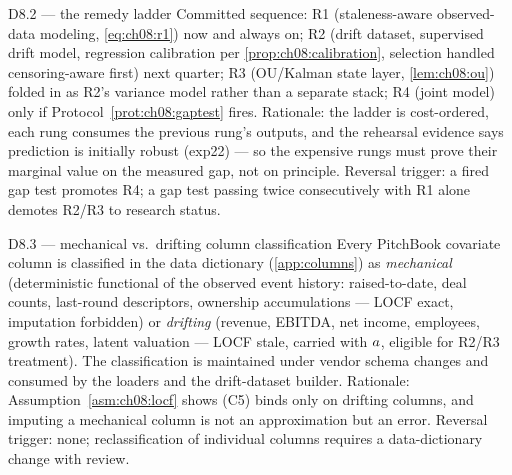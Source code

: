 \begin{decision}{D8.2 --- the remedy ladder}
Committed sequence: R1 (staleness-aware observed-data modeling,
\cref{eq:ch08:r1}) now and always on; R2 (drift dataset, supervised
drift model, regression calibration per \cref{prop:ch08:calibration},
selection handled censoring-aware first) next quarter; R3 (OU/Kalman
state layer, \cref{lem:ch08:ou}) folded in as R2's variance model rather
than a separate stack; R4 (joint model) only if
Protocol~\ref{prot:ch08:gaptest} fires. Rationale: the ladder is cost-ordered,
each rung consumes the previous rung's outputs, and the rehearsal
evidence says prediction is initially robust (exp22) --- so the
expensive rungs must prove their marginal value on the measured gap, not
on principle. Reversal trigger: a fired gap test promotes R4; a gap
test passing twice consecutively with R1 alone demotes R2/R3 to
research status.
\end{decision}

\begin{decision}{D8.3 --- mechanical vs.\ drifting column classification}
Every PitchBook covariate column is classified in the data dictionary
(\cref{app:columns}) as \emph{mechanical} (deterministic functional of
the observed event history: raised-to-date, deal counts, last-round
descriptors, ownership accumulations --- LOCF exact, imputation
forbidden) or \emph{drifting} (revenue, EBITDA, net income, employees,
growth rates, latent valuation --- LOCF stale, carried with
$a$, eligible for R2/R3 treatment). The classification is
maintained under vendor schema changes and consumed by the loaders and
the drift-dataset builder. Rationale: Assumption~\ref{asm:ch08:locf} shows (C5)
binds only on drifting columns, and imputing a mechanical column is not
an approximation but an error. Reversal trigger: none; reclassification
of individual columns requires a data-dictionary change with review.
\end{decision}

